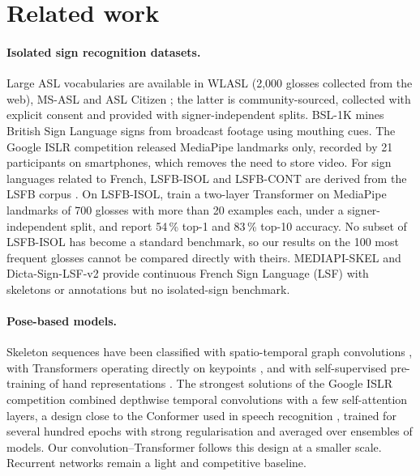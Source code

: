 \section{Related work}
\label{sec:related}

\paragraph{Isolated sign recognition datasets.}
Large ASL vocabularies are available in WLASL \citep{li2020wlasl} (2{,}000 glosses collected from
the web), MS-ASL \citep{joze2019msasl} and ASL Citizen \citep{desai2023aslcitizen}; the latter is
community-sourced, collected with explicit consent and provided with signer-independent splits.
BSL-1K \citep{albanie2020bsl1k} mines British Sign Language signs from broadcast footage using
mouthing cues. The Google ISLR competition \citep{kaggle_islr} released MediaPipe landmarks only,
recorded by 21 participants on smartphones, which removes the need to store video. For sign
languages related to French, LSFB-ISOL and LSFB-CONT \citep{fink2021lsfb} are derived from the LSFB
corpus \citep{meurant2015corpus}. On LSFB-ISOL, \citet{fink2023dictionary} train a two-layer
Transformer on MediaPipe landmarks of 700 glosses with more than 20 examples each, under a
signer-independent split, and report 54\,\% top-1 and 83\,\% top-10 accuracy. No subset of
LSFB-ISOL has become a standard benchmark, so our results on the 100 most frequent glosses cannot be
compared directly with theirs. MEDIAPI-SKEL \citep{bull2020mediapi} and
Dicta-Sign-LSF-v2 \citep{belissen2020dictasign} provide continuous French Sign Language (LSF) with
skeletons or annotations but no isolated-sign benchmark.

\paragraph{Pose-based models.}
Skeleton sequences have been classified with spatio-temporal graph convolutions
\citep{yan2018stgcn,jiang2021samslr,tunga2021gcnbert}, with Transformers operating directly on
keypoints \citep{bohacek2022spoter}, and with self-supervised pre-training of hand representations
\citep{hu2021signbert}. The strongest solutions of the Google ISLR competition combined depthwise
temporal convolutions with a few self-attention layers, a design close to the Conformer used in
speech recognition \citep{gulati2020conformer}, trained for several hundred epochs with strong
regularisation and averaged over ensembles of models. Our convolution--Transformer follows this
design at a smaller scale. Recurrent networks \citep{cho2014gru} remain a light and competitive baseline.

